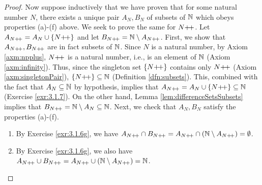 \documentclass[../main.tex]{subfiles}
\begin{document}
\begin{enumerate}[ref={\thesection.\arabic*}]
\begin{proof}
        Now suppose inductively that we have proven that for some natural number $N$, there exists a unique pair $A_N,B_N$ of subsets of $\mathbb{N}$ which obeys properties (a)-(f) above. We seek to prove the same for $N{+\!+}$. Let $A_{N{+\!+}}=A_N\cup\{N{+\!+}\}$ and let $B_{N{+\!+}}=\mathbb{N}\setminus A_{N{+\!+}}$. First, we show that $A_{N{+\!+}},B_{N{+\!+}}$ are in fact subsets of $\mathbb{N}$. Since $N$ is a natural number, by Axiom \ref{axm:npplus}, $N{+\!+}$ is a natural number, i.e., is an element of $\mathbb{N}$ (Axiom \ref{axm:infinity}). Thus, since the singleton set $\{N{+\!+}\}$ contains only $N{+\!+}$ (Axiom \ref{axm:singletonPair}), $\{N{+\!+}\}\subseteq\mathbb{N}$ (Definition \ref{dfn:subsets}). This, combined with the fact that $A_N\subseteq\mathbb{N}$ by hypothesis, implies that $A_{N{+\!+}}=A_N\cup\{N{+\!+}\}\subseteq\mathbb{N}$ (Exercise \ref{exr:3.1.7}). On the other hand, Lemma \ref{lem:differenceSetsSubsets} implies that $B_{N{+\!+}}=\mathbb{N}\setminus A_N\subseteq\mathbb{N}$. Next, we check that $A_N,B_N$ satisfy the properties (a)-(f).
        \begin{enumerate}
            \item By Exercise \ref{exr:3.1.6g}, we have $A_{N{+\!+}}\cap B_{N{+\!+}}=A_{N{+\!+}}\cap(\mathbb{N}\setminus A_{N{+\!+}})=\emptyset$.
            \item By Exercise \ref{exr:3.1.6g}, we also have $A_{N{+\!+}}\cup B_{N{+\!+}}=A_{N{+\!+}}\cup(\mathbb{N}\setminus A_{N{+\!+}})=\mathbb{N}$.

\end{enumerate}
\end{proof}
\end{enumerate}
\end{document}
